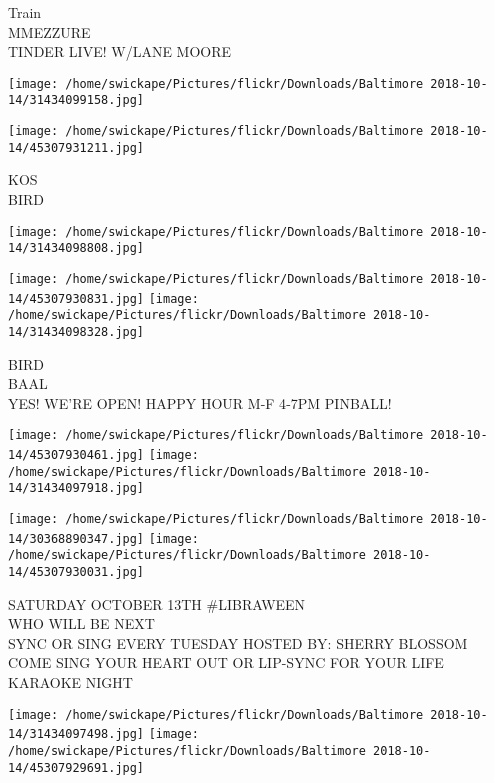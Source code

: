 \documentclass[10pt,letterpaper]{article}
\begin{document}
Train\\
MMEZZURE\\
TINDER LIVE! W/LANE MOORE\\
\pagebreak

\texttt{[image: /home/swickape/Pictures/flickr/Downloads/Baltimore 2018-10-14/31434099158.jpg]}

\vspace{0.25in}
\texttt{[image: /home/swickape/Pictures/flickr/Downloads/Baltimore 2018-10-14/45307931211.jpg]}

KOS\\
BIRD\\
\pagebreak

\texttt{[image: /home/swickape/Pictures/flickr/Downloads/Baltimore 2018-10-14/31434098808.jpg]}

\vspace{0.25in}
\texttt{[image: /home/swickape/Pictures/flickr/Downloads/Baltimore 2018-10-14/45307930831.jpg]}
\texttt{[image: /home/swickape/Pictures/flickr/Downloads/Baltimore 2018-10-14/31434098328.jpg]}

BIRD\\
BAAL\\
YES!  WE'RE OPEN!  HAPPY HOUR M{-}F 4{-}7PM PINBALL!\\
\pagebreak

\texttt{[image: /home/swickape/Pictures/flickr/Downloads/Baltimore 2018-10-14/45307930461.jpg]}
\texttt{[image: /home/swickape/Pictures/flickr/Downloads/Baltimore 2018-10-14/31434097918.jpg]}

\texttt{[image: /home/swickape/Pictures/flickr/Downloads/Baltimore 2018-10-14/30368890347.jpg]}
\texttt{[image: /home/swickape/Pictures/flickr/Downloads/Baltimore 2018-10-14/45307930031.jpg]}

SATURDAY OCTOBER 13TH \#LIBRAWEEN\\
WHO WILL BE NEXT\\
SYNC OR SING EVERY TUESDAY HOSTED BY: SHERRY BLOSSOM COME SING YOUR HEART OUT OR LIP{-}SYNC FOR YOUR LIFE\\
KARAOKE NIGHT\\
\pagebreak

\texttt{[image: /home/swickape/Pictures/flickr/Downloads/Baltimore 2018-10-14/31434097498.jpg]}
\texttt{[image: /home/swickape/Pictures/flickr/Downloads/Baltimore 2018-10-14/45307929691.jpg]}
\end{document}
